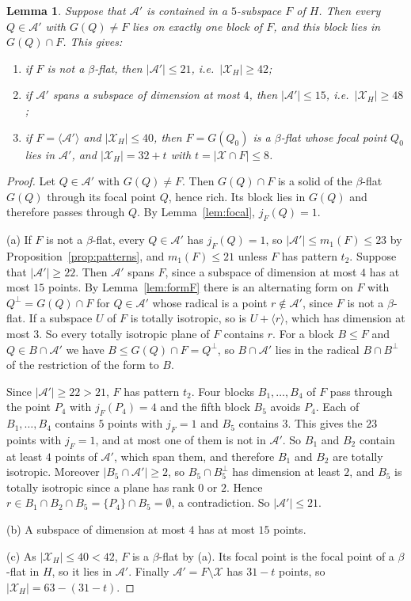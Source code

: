 \documentclass[11pt]{amsart}
\newtheorem{lemma}[theorem]{Lemma}
\theoremstyle{definition}
\newcommand{\X}{\mathcal{X}}
\newcommand{\A}{\mathcal{A}}
\begin{document}
\begin{lemma}\label{lem:nonspan}
Suppose that $\A'$ is contained in a $5$-subspace $F$ of $H$. Then every $Q\in\A'$ with $G(Q)\ne F$ lies on exactly one block of $F$, and this block lies in $G(Q)\cap F$. This gives:
\begin{enumerate}[label=(\alph*)]
\item if $F$ is not a $\beta$-flat, then $|\A'|\le21$, i.e.\ $|\X_H|\ge42$;
\item if $\A'$ spans a subspace of dimension at most $4$, then $|\A'|\le15$, i.e.\ $|\X_H|\ge48$;
\item if $F=\langle\A'\rangle$ and $|\X_H|\le40$, then $F=G(Q_0)$ is a $\beta$-flat whose focal point $Q_0$ lies in $\A'$, and $|\X_H|=32+t$ with $t=|\X\cap F|\le8$.
\end{enumerate}
\end{lemma}
\begin{proof}
Let $Q\in\A'$ with $G(Q)\ne F$. Then $G(Q)\cap F$ is a solid of the $\beta$-flat $G(Q)$ through its focal point $Q$, hence rich. Its block lies in $G(Q)$ and therefore passes through $Q$. By Lemma~\ref{lem:focal}, $j_F(Q)=1$.

(a) If $F$ is not a $\beta$-flat, every $Q\in\A'$ has $j_F(Q)=1$, so $|\A'|\le m_1(F)\le23$ by Proposition~\ref{prop:patterns}, and $m_1(F)\le21$ unless $F$ has pattern $t_2$. Suppose that $|\A'|\ge22$. Then $\A'$ spans $F$, since a subspace of dimension at most $4$ has at most $15$ points. By Lemma~\ref{lem:formF} there is an alternating form on $F$ with $Q^\perp=G(Q)\cap F$ for $Q\in\A'$ whose radical is a point $r\notin\A'$, since $F$ is not a $\beta$-flat. If a subspace $U$ of $F$ is totally isotropic, so is $U+\langle r\rangle$, which has dimension at most $3$. So every totally isotropic plane of $F$ contains $r$. For a block $B\le F$ and $Q\in B\cap\A'$ we have $B\le G(Q)\cap F=Q^\perp$, so $B\cap\A'$ lies in the radical $B\cap B^\perp$ of the restriction of the form to $B$.

Since $|\A'|\ge22>21$, $F$ has pattern $t_2$. Four blocks $B_1,\dots,B_4$ of $F$ pass through the point $P_4$ with $j_F(P_4)=4$ and the fifth block $B_5$ avoids $P_4$. Each of $B_1,\dots,B_4$ contains $5$ points with $j_F=1$ and $B_5$ contains $3$. This gives the $23$ points with $j_F=1$, and at most one of them is not in $\A'$. So $B_1$ and $B_2$ contain at least $4$ points of $\A'$, which span them, and therefore $B_1$ and $B_2$ are totally isotropic. Moreover $|B_5\cap\A'|\ge2$, so $B_5\cap B_5^\perp$ has dimension at least $2$, and $B_5$ is totally isotropic since a plane has rank $0$ or $2$. Hence $r\in B_1\cap B_2\cap B_5=\{P_4\}\cap B_5=\emptyset$, a contradiction. So $|\A'|\le21$.

(b) A subspace of dimension at most $4$ has at most $15$ points.

(c) As $|\X_H|\le40<42$, $F$ is a $\beta$-flat by (a). Its focal point is the focal point of a $\beta$-flat in $H$, so it lies in $\A'$. Finally $\A'=F\setminus\X$ has $31-t$ points, so $|\X_H|=63-(31-t)$.
\end{proof}
\end{document}
